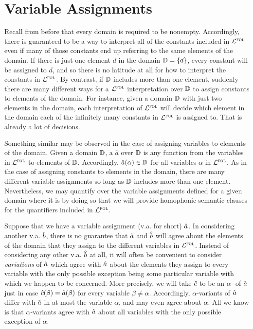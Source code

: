 \section{Variable Assignments}
\label{ch9.VariableAssignments}

Recall from before that every domain is required to be nonempty.
Accordingly, there is guaranteed to be a way to interpret all of the constants included in $\mathcal{L}^{\textsc{fol}}$ even if many of those constants end up referring to the same elements of the domain.
If there is just one element $d$ in the domain $\mathbb{D}=\lbrace d\rbrace$, every constant will be assigned to $d$, and so there is no latitude at all for how to interpret the constants in $\mathcal{L}^{\textsc{fol}}$.
By contrast, if $\mathbb{D}$ includes more than one element, suddenly there are many different ways for a $\mathcal{L}^{\textsc{fol}}$ interpretation over $\mathbb{D}$ to assign constants to elements of the domain. 
For instance, given a domain $\mathbb{D}$ with just two elements in the domain, each interpretation of $\mathcal{L}^{\textsc{fol}}$ will decide which element in the domain each of the infinitely many constants in $\mathcal{L}^{\textsc{fol}}$ is assigned to.
That is already a lot of decisions.

Something similar may be observed in the case of assigning variables to elements of the domain.
Given a domain $\mathbb{D}$, a  $\hat{a}$ over $\mathbb{D}$ is any function from the variables in $\mathcal{L}^{\textsc{fol}}$ to elements of $\mathbb{D}$.
Accordingly, $\hat{a}(\alpha)\in\mathbb{D}$ for all variables $\alpha$ in $\mathcal{L}^{\textsc{fol}}$. 
As in the case of assigning constants to elements in the domain, there are many different variable assignments so long as $\mathbb{D}$ includes more than one element. 
Nevertheless, we may quantify over the variable assignments defined for a given domain where it is by doing so that we will provide homophonic semantic clauses for the quantifiers included in $\mathcal{L}^{\textsc{fol}}$.

Suppose that we have a variable assignment (v.a. for short) $\hat{a}$.
In considering another v.a. $\hat{b}$, there is no guarantee that $\hat{a}$ and $\hat{b}$ will agree about the elements of the domain that they assign to the different variables in $\mathcal{L}^{\textsc{fol}}$.
Instead of considering any other v.a. $\hat{b}$ at all, it will often be convenient to consider \textit{variations} of $\hat{a}$ which agree with $\hat{a}$ about the elements they assign to every variable with the only possible exception being some particular variable with which we happen to be concerned.
More precisely, we will take $\hat{c}$ to be an $\alpha$- of $\hat{a}$ just in case $\hat{c}(\beta)=\hat{a}(\beta)$ for every variable $\beta\neq\alpha$.
Accordingly, $\alpha$-variants of $\hat{a}$ differ with $\hat{a}$ in at most the variable $\alpha$, and may even agree about $\alpha$.
All we know is that $\alpha$-variants agree with $\hat{a}$ about all variables with the only possible exception of $\alpha$.

